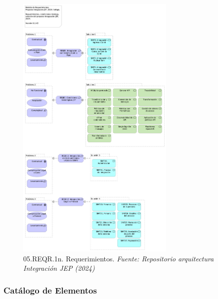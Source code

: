 \documentclass[
  paper=a4,
  ,captions=tableheading
]{scrartcl}
\begin{document}
\begin{figure}
\centering
\includegraphics[width=\textwidth,height=5.20833in]{images/05.REQR.1n.Requerimientos.png}
\caption{05.REQR.1n. Requerimientos. \emph{Fuente: Repositorio
arquitectura Integración JEP
(2024)}}\label{fig:id-062616daaa1d4d8990681b58bc54ce3d}
\end{figure}

\subsubsection{Catálogo de
Elementos}\label{sec:catuxe1logo-de-elementos-2}
\end{document}
